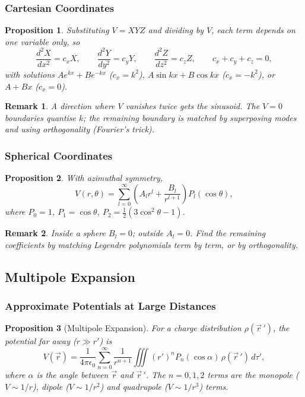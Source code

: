 \documentclass{article}
\newtheorem{remark}{Remark}
\newtheorem{proposition}{Proposition}
\begin{document}
\subsubsection{Cartesian Coordinates}
\begin{proposition}
    Substituting $V = XYZ$ and dividing by $V$, each term depends on one variable only, so
    \[\frac{d^2X}{dx^2} = c_xX, \qquad \frac{d^2Y}{dy^2} = c_yY, \qquad \frac{d^2Z}{dz^2} = c_zZ, \qquad c_x + c_y + c_z = 0,\]
    with solutions $Ae^{kx} + Be^{-kx}$ ($c_x = k^2$), $A\sin kx + B\cos kx$ ($c_x = -k^2$), or $A + Bx$ ($c_x = 0$).
\end{proposition}
\begin{remark}
    A direction where $V$ vanishes twice gets the sinusoid. The $V = 0$ boundaries quantise $k$; the remaining boundary is matched by superposing modes and using orthogonality (Fourier's trick).
\end{remark}

\subsubsection{Spherical Coordinates}
\begin{proposition}
    With azimuthal symmetry,
    \[V(r,\theta) = \sum_{l=0}^\infty \left(A_l r^l + \frac{B_l}{r^{l+1}}\right)P_l(\cos\theta),\]
    where $P_0 = 1$, $P_1 = \cos\theta$, $P_2 = \frac{1}{2}(3\cos^2\theta - 1)$.
\end{proposition}
\begin{remark}
    Inside a sphere $B_l = 0$; outside $A_l = 0$. Find the remaining coefficients by matching Legendre polynomials term by term, or by orthogonality.
\end{remark}

\subsection{Multipole Expansion}
\subsubsection{Approximate Potentials at Large Distances}
\begin{proposition}[Multipole Expansion]
    For a charge distribution $\rho(\vec{r}\,')$, the potential far away ($r \gg r'$) is
    \[V(\vec{r}) = \frac{1}{4\pi\epsilon_0}\sum_{n=0}^\infty \frac{1}{r^{n+1}}\iiint (r')^n P_n(\cos\alpha)\,\rho(\vec{r}\,')\,d\tau',\]
    where $\alpha$ is the angle between $\vec{r}$ and $\vec{r}\,'$. The $n = 0, 1, 2$ terms are the monopole ($V \sim 1/r$), dipole ($V \sim 1/r^2$) and quadrupole ($V \sim 1/r^3$) terms.
\end{proposition}
\end{document}
